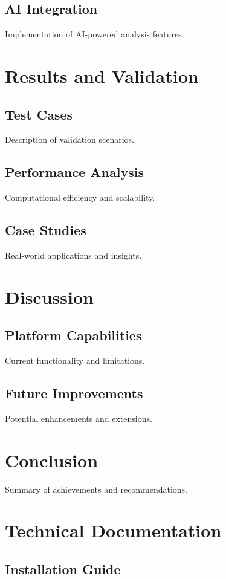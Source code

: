 \documentclass{article}
\begin{document}
\subsection{AI Integration}
Implementation of AI-powered analysis features.

\section{Results and Validation}
\subsection{Test Cases}
Description of validation scenarios.

\subsection{Performance Analysis}
Computational efficiency and scalability.

\subsection{Case Studies}
Real-world applications and insights.

\section{Discussion}
\subsection{Platform Capabilities}
Current functionality and limitations.

\subsection{Future Improvements}
Potential enhancements and extensions.

\section{Conclusion}
Summary of achievements and recommendations.

\appendix
\section{Technical Documentation}
\subsection{Installation Guide}
\end{document}
